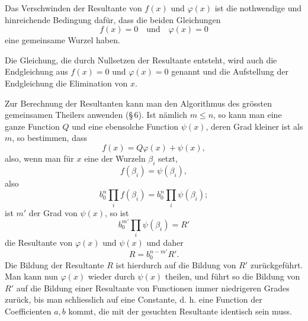 \documentclass[11pt]{article}
\begin{document}
Das Verschwinden der Resultante von $f(x)$ und $\varphi(x)$ ist die nothwendige und hinreichende Bedingung dafür, dass die beiden Gleichungen
\[
f(x)=0\quad\text{und}\quad \varphi(x)=0
\]
eine gemeinsame Wurzel haben.

Die Gleichung, die durch Nullsetzen der Resultante entsteht, wird auch die Endgleichung aus $f(x)=0$ und $\varphi(x)=0$ genannt und die Aufstellung der Endgleichung die Elimination von $x$.

Zur Berechnung der Resultanten kann man den Algorithmus des grössten gemeinsamen Theilers anwenden (\S\,6). Ist nämlich $m\le n$, so kann man eine ganze Function $Q$ und eine ebensolche Function $\psi(x)$, deren Grad kleiner ist als $m$, so bestimmen, dass
\[
f(x)=Q\varphi(x)+\psi(x),
\]
also, wenn man für $x$ eine der Wurzeln $\beta_i$ setzt,
\[
f(\beta_i)=\psi(\beta_i),
\]
also
\begin{equation}
b_0^n\prod_i f(\beta_i)=b_0^n\prod_i\psi(\beta_i);
\tag{8}
\end{equation}
ist $m'$ der Grad von $\psi(x)$, so ist
\begin{equation}
b_0^{m'}\prod_i\psi(\beta_i)=R'
\tag{9}
\end{equation}
die Resultante von $\varphi(x)$ und $\psi(x)$ und daher
\begin{equation}
R=b_0^{n-m'}R'.
\tag{10}
\end{equation}
Die Bildung der Resultante $R$ ist hierdurch auf die Bildung von $R'$ zurückgeführt. Man kann nun $\varphi(x)$ wieder durch $\psi(x)$ theilen, und führt so die Bildung von $R'$ auf die Bildung einer Resultante von Functionen immer niedrigeren Grades zurück, bis man schliesslich auf eine Constante, d. h. eine Function der Coefficienten $a,b$ kommt, die mit der gesuchten Resultante identisch sein muss.
\end{document}
